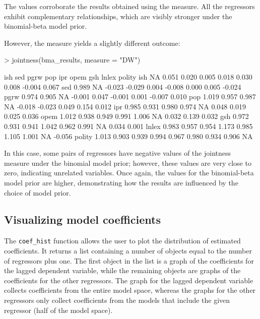 \documentclass[a4paper]{article}
\begin{document}
\noindent The values corroborate the results obtained using the \citet{Hofmarcher+2018} measure.
All the regressors exhibit complementary relationships, which are visibly stronger under the binomial-beta model prior.

However, the \citet{Doppelhofer+2009} measure yields a slightly different outcome:

\begin{Schunk}
\begin{Sinput}
> jointness(bma_results, measure = "DW")
\end{Sinput}
\begin{Soutput}
         ish   sed   pgrw    pop    ipr   opem   gsh  lnlex polity
ish       NA 0.051  0.020  0.005  0.018  0.030 0.008 -0.004  0.067
sed    0.989    NA -0.023 -0.029  0.004 -0.008 0.000  0.005 -0.024
pgrw   0.974 0.905     NA -0.001  0.047 -0.001 0.001 -0.007  0.010
pop    1.019 0.957  0.987     NA -0.018 -0.023 0.049  0.154  0.012
ipr    0.985 0.931  0.980  0.974     NA  0.048 0.019  0.025  0.036
opem   1.012 0.938  0.949  0.991  1.006     NA 0.032  0.139  0.032
gsh    0.972 0.931  0.941  1.042  0.962  0.991    NA  0.034  0.001
lnlex  0.983 0.957  0.954  1.173  0.985  1.105 1.001     NA -0.056
polity 1.013 0.903  0.939  0.994  0.967  0.980 0.934  0.906     NA
\end{Soutput}
\end{Schunk}

\noindent In this case, some pairs of regressors have negative values of the jointness measure under the binomial model prior;
however, these values are very close to zero, indicating unrelated variables.
Once again, the values for the binomial-beta model prior are higher, demonstrating how the results are influenced by the choice of model prior.

\subsection{Visualizing model coefficients}

The \verb+coef_hist+ function allows the user to plot the distribution of estimated coefficients.
It returns a list containing a number of objects equal to the number of regressors plus one.
The first object in the list is a graph of the coefficients for the lagged dependent variable, while the remaining objects are graphs of the coefficients for the other regressors.
The graph for the lagged dependent variable collects coefficients from the entire model space, whereas the graphs for the other regressors only collect coefficients from the models that include the given regressor (half of the model space).
\end{document}
